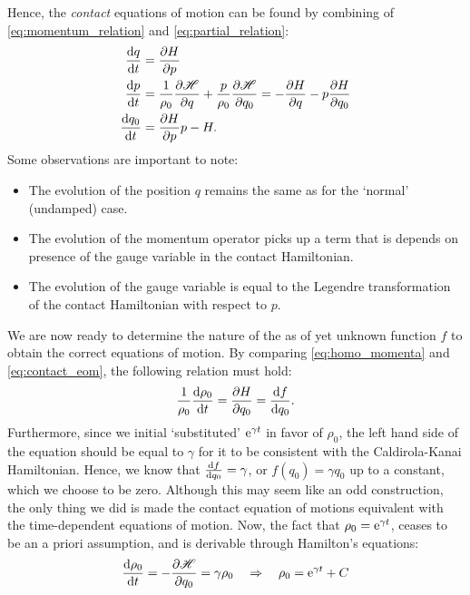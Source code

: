 Hence, the \emph{contact} equations of motion can be found by combining of \cref{eq:momentum_relation} and \cref{eq:partial_relation}:
\begin{equation}
    \begin{split}
        \dv{q}{t} &= \pdv{H}{p} \\
        \dv{p}{t} &= \frac{1}{\rho_0}\pdv{\mathscr{H}}{q} + \frac{p}{\rho_0}\pdv{\mathscr{H}}{q_0} = - \pdv{H}{q} - p\pdv{H}{q_0} \\
        \dv{q_0}{t} &= \pdv{H}{p}p - H.
    \end{split}
    \label{eq:contact_eom}
\end{equation}
Some observations are important to note:
\begin{itemize}
    \item The evolution of the position $q$ remains the same as for the `normal' (undamped) case.
    \item The evolution of the momentum operator picks up a term that is depends on presence of the gauge variable in the contact Hamiltonian.
    \item The evolution of the gauge variable is equal to the Legendre transformation of the contact Hamiltonian with respect to $p$.
\end{itemize}

We are now ready to determine the nature of the as of yet unknown function $f$ to obtain the correct equations of motion. By comparing \cref{eq:homo_momenta} and \cref{eq:contact_eom}, the following relation must hold:
$$ \frac{1}{\rho_0}\dv{\rho_0}{t} = \pdv{H}{q_0} = \dv{f}{q_0}. $$
Furthermore, since we initial `substituted' $\mathrm{e}^{\gamma t}$ in favor of $\rho_0$, the left hand side of the equation should be equal to $\gamma$ for it to be consistent with the Caldirola-Kanai Hamiltonian. Hence, we know that $\dv{f}{q_0} = \gamma$, or $f(q_0) = \gamma q_0$ up to a constant, which we choose to be zero. Although this may seem like an odd construction, the only thing we did is made the contact equation of motions equivalent with the time-dependent equations of motion. Now, the fact that $\rho_0 = \mathrm{e}^{\gamma t}$, ceases to be an a priori assumption, and is derivable through Hamilton's equations:
$$ \dv{\rho_0}{t} = -\pdv{\mathscr{H}}{q_0} = \gamma\rho_0 \quad \Rightarrow \quad \rho_0 = \mathrm{e}^{\gamma t} + C$$

